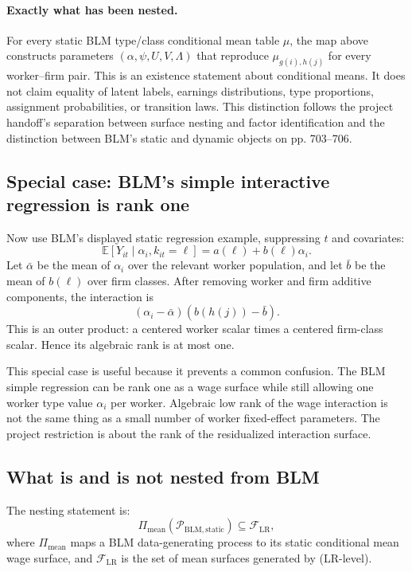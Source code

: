 \documentclass[11pt]{article}
\newcommand{\E}{\mathbb{E}}
\newcommand{\cF}{\mathcal{F}}
\newcommand{\cP}{\mathcal{P}}
\begin{document}
\paragraph{Exactly what has been nested.}
For every static BLM type/class conditional mean table \(\mu\), the map above
constructs parameters \((\alpha,\psi,U,V,\Lambda)\) that reproduce
\(\mu_{g(i),h(j)}\) for every worker--firm pair.  This is an existence statement
about conditional means.  It does not claim equality of latent labels,
earnings distributions, type proportions, assignment probabilities, or
transition laws.  This distinction follows the project handoff's separation
between surface nesting and factor identification and the distinction between
BLM's static and dynamic objects on pp. 703--706.

\subsection{Special case: BLM's simple interactive regression is rank one}

Now use BLM's displayed static regression example, suppressing \(t\) and
covariates:
\[
\E[Y_{it}\mid \alpha_i,k_{it}=\ell]
=
a(\ell)+b(\ell)\alpha_i.
\]
Let \(\bar \alpha\) be the mean of \(\alpha_i\) over the relevant worker
population, and let \(\bar b\) be the mean of \(b(\ell)\) over firm classes.
After removing worker and firm additive components, the interaction is
\[
(\alpha_i-\bar\alpha)(b(h(j))-\bar b).
\tag{rank-one-BLM}
\]
This is an outer product: a centered worker scalar times a centered firm-class
scalar. Hence its algebraic rank is at most one.

This special case is useful because it prevents a common confusion. The BLM
simple regression can be rank one as a wage surface while still allowing one
worker type value \(\alpha_i\) per worker. Algebraic low rank of the wage
interaction is not the same thing as a small number of worker fixed-effect
parameters. The project restriction is about the rank of the residualized
interaction surface.

\subsection{What is and is not nested from BLM}

The nesting statement is:
\[
\Pi_{\mathrm{mean}}(\cP_{\mathrm{BLM,static}})
\subseteq
\cF_{\mathrm{LR}},
\]
where \(\Pi_{\mathrm{mean}}\) maps a BLM data-generating process to its static
conditional mean wage surface, and \(\cF_{\mathrm{LR}}\) is the set of mean
surfaces generated by (LR-level).
\end{document}
